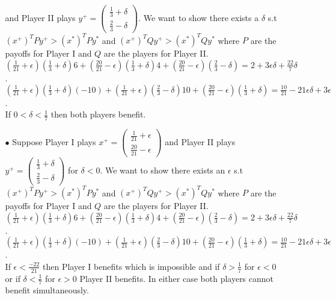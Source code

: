 \documentclass[10pt]{article}[H]
\begin{document}
\begin{itemize}
\begin{itemize}
        and Player II plays $y^+=\begin{pmatrix}
            \frac{1}{3}+\delta\\
            \frac{2}{3}-\delta
        \end{pmatrix}$. 
        We want to show there exists a $\delta$ s.t ${(x^+)}^T Py^+>{(x^*)}^T Py^*$ and ${(x^+)}^T Qy^+>{(x^*)}^T Qy^*$ where $P$ are the payoffs for Player I and $Q$ are the players for Player II.\\
        $(\frac{1}{21}+\epsilon)(\frac{1}{3}+\delta)6+(\frac{20}{21}-\epsilon)(\frac{1}{3}+\delta)4+(\frac{20}{21}-\epsilon)(\frac{2}{3}-\delta)=2+3\epsilon\delta+\frac{22}{7}\delta$.\\
        $(\frac{1}{21}+\epsilon)(\frac{1}{3}+\delta)(-10)+(\frac{1}{21}+\epsilon)(\frac{2}{3}-\delta)10+(\frac{20}{21}-\epsilon)(\frac{1}{3}+\delta)=\frac{10}{21}-21\epsilon\delta+3\epsilon$.\\
        If $0<\delta<\frac{1}{7}$ then both players benefit.
        \item [$\bullet$] Suppose Player I plays $x^+=\begin{pmatrix}
            \frac{1}{21}+\epsilon\\
            \frac{20}{21}-\epsilon
        \end{pmatrix}$
        and Player II plays $y^+=\begin{pmatrix}
            \frac{1}{3}+\delta\\
            \frac{2}{3}-\delta
        \end{pmatrix}$ for $\delta<0$. 
        We want to show there exists an $\epsilon$ s.t ${(x^+)}^T Py^+>{(x^*)}^T Py^*$ and ${(x^+)}^T Qy^+>{(x^*)}^T Qy^*$ where $P$ are the payoffs for Player I and $Q$ are the players for Player II.\\
        $(\frac{1}{21}+\epsilon)(\frac{1}{3}+\delta)6+(\frac{20}{21}-\epsilon)(\frac{1}{3}+\delta)4+(\frac{20}{21}-\epsilon)(\frac{2}{3}-\delta)=2+3\epsilon\delta+\frac{22}{7}\delta$.\\
        $(\frac{1}{21}+\epsilon)(\frac{1}{3}+\delta)(-10)+(\frac{1}{21}+\epsilon)(\frac{2}{3}-\delta)10+(\frac{20}{21}-\epsilon)(\frac{1}{3}+\delta)=\frac{10}{21}-21\epsilon\delta+3\epsilon$.\\
        If $\epsilon<\frac{-22}{21}$ then Player I benefits which is impossible and if $\delta>\frac{1}{7}$ for $\epsilon<0$ or if $\delta<\frac{1}{7}$ for $\epsilon>0$ Player II benefits. In either case both players cannot benefit simultaneously.
    \end{itemize}

\end{itemize}
\end{document}

